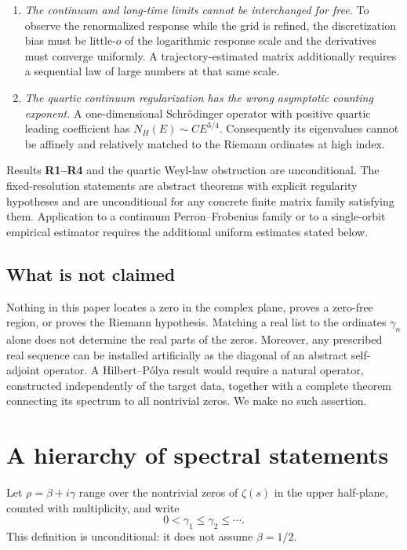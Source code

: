 \documentclass[11pt]{article}
\theoremstyle{definition}
\theoremstyle{remark}
\begin{document}
\begin{enumerate}[label=\textbf{R\arabic*.},leftmargin=3.2em]
    \item \emph{The continuum and long-time limits cannot be interchanged for free.}  To observe the renormalized response while the grid is refined, the discretization bias must be little-$o$ of the logarithmic response scale and the derivatives must converge uniformly.  A trajectory-estimated matrix additionally requires a sequential law of large numbers at that same scale.

    \item \emph{The quartic continuum regularization has the wrong asymptotic counting exponent.}  A one-dimensional Schr\"odinger operator with positive quartic leading coefficient has $N_H(E)\sim C E^{3/4}$.  Consequently its eigenvalues cannot be affinely and relatively matched to the Riemann ordinates at high index.
\end{enumerate}

Results \textbf{R1--R4} and the quartic Weyl-law obstruction are unconditional.  The fixed-resolution statements are abstract theorems with explicit regularity hypotheses and are unconditional for any concrete finite matrix family satisfying them.  Application to a continuum Perron--Frobenius family or to a single-orbit empirical estimator requires the additional uniform estimates stated below.

\subsection*{What is not claimed}

Nothing in this paper locates a zero in the complex plane, proves a zero-free region, or proves the Riemann hypothesis.  Matching a real list to the ordinates $\gamma_n$ alone does not determine the real parts of the zeros.  Moreover, any prescribed real sequence can be installed artificially as the diagonal of an abstract self-adjoint operator.  A Hilbert--P\'{o}lya result would require a natural operator, constructed independently of the target data, together with a complete theorem connecting its spectrum to all nontrivial zeros.  We make no such assertion.

\section{A hierarchy of spectral statements}\label{sec:hierarchy}

Let $\rho=\beta+i\gamma$ range over the nontrivial zeros of $\zeta(s)$ in the upper half-plane, counted with multiplicity, and write
\[
    0<\gamma_1\le\gamma_2\le\cdots.
\]
This definition is unconditional: it does not assume $\beta=1/2$.
\end{document}

